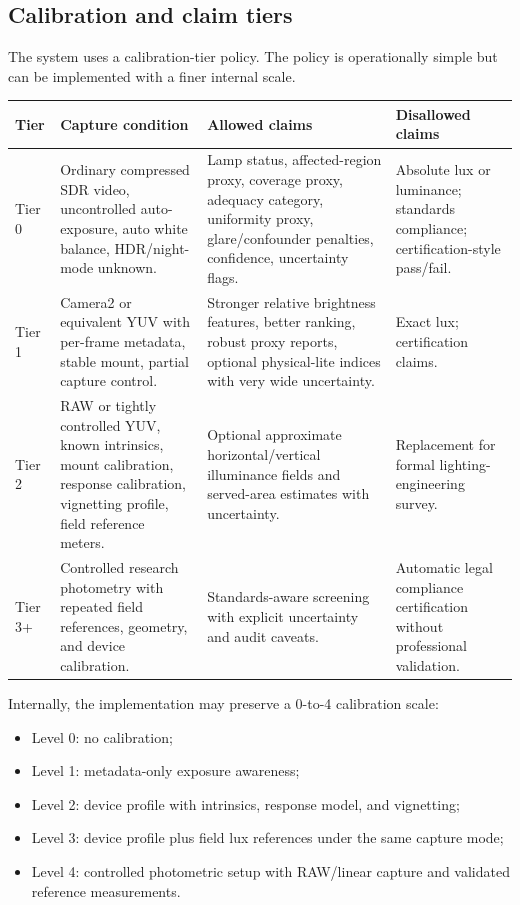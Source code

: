 \documentclass[11pt]{article}
\begin{document}
\subsection{Calibration and claim tiers}

The system uses a calibration-tier policy. The policy is operationally simple but can be implemented with a finer internal scale.

\begin{center}
\small
\begin{tabular}{p{}p{}p{}p{}}
\toprule
\textbf{Tier} & \textbf{Capture condition} & \textbf{Allowed claims} & \textbf{Disallowed claims} \\
\midrule
Tier 0 & Ordinary compressed SDR video, uncontrolled auto-exposure, auto white balance, HDR/night-mode unknown. & Lamp status, affected-region proxy, coverage proxy, adequacy category, uniformity proxy, glare/confounder penalties, confidence, uncertainty flags. & Absolute lux or luminance; standards compliance; certification-style pass/fail. \\
Tier 1 & Camera2 or equivalent YUV with per-frame metadata, stable mount, partial capture control. & Stronger relative brightness features, better ranking, robust proxy reports, optional physical-lite indices with very wide uncertainty. & Exact lux; certification claims. \\
Tier 2 & RAW or tightly controlled YUV, known intrinsics, mount calibration, response calibration, vignetting profile, field reference meters. & Optional approximate horizontal/vertical illuminance fields and served-area estimates with uncertainty. & Replacement for formal lighting-engineering survey. \\
Tier 3+ & Controlled research photometry with repeated field references, geometry, and device calibration. & Standards-aware screening with explicit uncertainty and audit caveats. & Automatic legal compliance certification without professional validation. \\
\bottomrule
\end{tabular}
\end{center}

Internally, the implementation may preserve a 0-to-4 calibration scale:
\begin{itemize}
  \item Level 0: no calibration;
  \item Level 1: metadata-only exposure awareness;
  \item Level 2: device profile with intrinsics, response model, and vignetting;
  \item Level 3: device profile plus field lux references under the same capture mode;
  \item Level 4: controlled photometric setup with RAW/linear capture and validated reference measurements.
\end{itemize}
\end{document}
